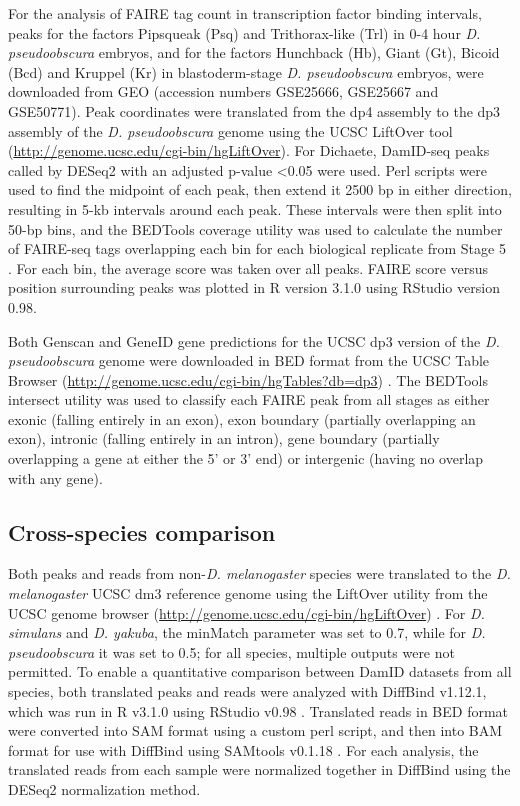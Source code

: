 For the analysis of FAIRE tag count in transcription factor binding intervals, peaks for the factors Pipsqueak (Psq) and Trithorax-like (Trl) in 0-4 hour \emph{D. pseudoobscura} embryos, and for the factors Hunchback (Hb), Giant (Gt), Bicoid (Bcd) and Kruppel (Kr) in blastoderm-stage \emph{D. pseudoobscura} embryos, were downloaded from GEO (accession numbers GSE25666, GSE25667 and GSE50771). Peak coordinates were translated from the dp4 assembly to the dp3 assembly of the \emph{D. pseudoobscura} genome using the UCSC LiftOver tool (\url{http://genome.ucsc.edu/cgi-bin/hgLiftOver}). For Dichaete, DamID-seq peaks called by DESeq2 with an adjusted p-value \textless 0.05 were used. Perl scripts were used to find the midpoint of each peak, then extend it 2500 bp in either direction, resulting in 5-kb intervals around each peak. These intervals were then split into 50-bp bins, and the BEDTools coverage utility was used to calculate the number of FAIRE-seq tags overlapping each bin for each biological replicate from Stage 5 \citep{quinlan_bedtools:_2010}. For each bin, the average score was taken over all peaks. FAIRE score versus position surrounding peaks was plotted in R version 3.1.0 using RStudio version 0.98.

Both Genscan and GeneID gene predictions for the UCSC dp3 version of the \emph{D. pseudoobscura} genome were downloaded in BED format from the UCSC Table Browser (\url{http://genome.ucsc.edu/cgi-bin/hgTables?db=dp3}) \citep{burge_prediction_1997,karolchik_ucsc_2004, karolchik_ucsc_2014,parra_geneid_2000}. The BEDTools intersect utility \citep{quinlan_bedtools:_2010} was used to classify each FAIRE peak from all stages as either exonic (falling entirely in an exon), exon boundary (partially overlapping an exon), intronic (falling entirely in an intron), gene boundary (partially overlapping a gene at either the 5' or 3' end) or intergenic (having no overlap with any gene).

\subsection{Cross-species comparison}
Both peaks and reads from non-\emph{D. melanogaster} species were translated to the \emph{D. melanogaster} UCSC dm3 reference genome using the LiftOver utility from the UCSC genome browser (\url{http://genome.ucsc.edu/cgi-bin/hgLiftOver}) \citep{bardet_computational_2011}. For \emph{D. simulans} and \emph{D. yakuba}, the minMatch parameter was set to 0.7, while for \emph{D. pseudoobscura} it was set to 0.5; for all species, multiple outputs were not permitted. To enable a quantitative comparison between DamID datasets from all species, both translated peaks and reads were analyzed with DiffBind v1.12.1, which was run in R v3.1.0 using RStudio v0.98 \citep{ross-innes_differential_2012}. Translated reads in BED format were converted into SAM format using a custom perl script, and then into BAM format for use with DiffBind using SAMtools v0.1.18 \citep{li_sequence_2009}. For each analysis, the translated reads from each sample were normalized together in DiffBind using the DESeq2 normalization method. 

